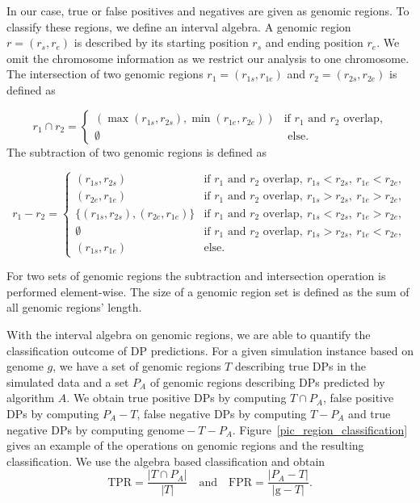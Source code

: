In our case, true or false positives and negatives are given as genomic regions.
To classify these regions, we define an interval algebra.
A genomic region $r=(r_s, r_e)$ is described by its starting position $r_s$ and ending position $r_e$.
We omit the chromosome information as we restrict our analysis to one chromosome.
The intersection of two genomic regions $r_1=(r_{1s}, r_{1e})$ and $r_2=(r_{2s}, r_{2e})$ is defined as

\[
r_1 \cap r_2 = 
  \begin{cases}
    (\max(r_{1s}, r_{2s}), \min(r_{1e}, r_{2e})) & \text{if } r_1 \text{ and } r_2 \text{ overlap,} \\
    \emptyset & \text{ else.}
  \end{cases}
\]
\noindent
The subtraction of two genomic regions is defined as

\[
r_1 - r_2 = 
  \begin{cases}
    (r_{1s}, r_{2s}) 			& \text{if } r_1 \text{ and } r_2 \text{ overlap},\ r_{1s} < r_{2s},\ r_{1e} < r_{2e},\\
    (r_{2e}, r_{1e}) 			& \text{if } r_1 \text{ and } r_2 \text{ overlap},\ r_{1s} > r_{2s},\ r_{1e} > r_{2e},\\
    \{(r_{1s}, r_{2s}), (r_{2e}, r_{1e})\} 	& \text{if } r_1 \text{ and } r_2 \text{ overlap},\ r_{1s} < r_{2s},\ r_{1e} > r_{2e},\\
    \emptyset 				& \text{if } r_1 \text{ and } r_2 \text{ overlap},\ r_{1s} > r_{2s},\ r_{1e} < r_{2e},\\
    (r_{1s}, r_{1e}) 			& \text{else.}
  \end{cases}
\]

\noindent
For two sets of genomic regions the subtraction and intersection operation is performed element-wise.
The size of a genomic region set is defined as the sum of all genomic regions' length.

With the interval algebra on genomic regions, we are able to quantify the classification outcome of DP predictions. 
For a given simulation instance based on genome $g$, we have a set of genomic regions $T$ describing true DPs in the simulated data and a set $P_A$ of genomic regions describing DPs predicted by algorithm $A$.
We obtain true positive DPs by computing $T \cap P_A$, false positive DPs by computing $P_A - T$, false negative DPs by computing $T - P_A$ and true negative DPs by computing $\text{genome} - T - P_A$.
Figure~\ref{pic_region_classification} gives an example of the operations on genomic regions and the resulting classification.
We use the algebra based classification and obtain
$$\text{TPR} = \frac{|T \cap P_A|}{|T|} \quad \text{and} \quad \text{FPR} = \frac{|P_A - T|}{|\text{g} - T|}.$$

